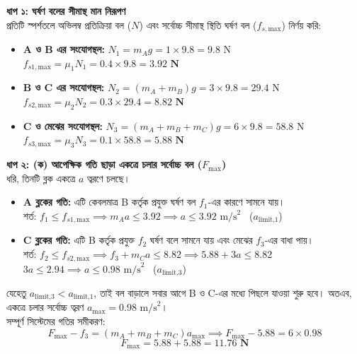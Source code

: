\documentclass[12pt, a4paper]{article}
\begin{document}
\begin{tcolorbox}[solutionbox={সমাধান (Solution) }]
\noindent
\textbf{ধাপ ১: ঘর্ষণ বলের সীমাস্থ মান নিরূপণ} \\
প্রতিটি স্পর্শতলে অভিলম্ব প্রতিক্রিয়া বল ($N$) এবং সর্বোচ্চ সীমাস্থ স্থিতি ঘর্ষণ বল ($f_{s,\text{max}}$) নির্ণয় করি:
\begin{itemize}[leftmargin=*, parsep=0.5ex]
    \item \textbf{A ও B এর সংযোগস্থল:} $N_1 = m_A g = 1 \times 9.8 = 9.8\text{ N}$ \\
    $f_{s1,\text{max}} = \mu_1 N_1 = 0.4 \times 9.8 = \mathbf{3.92\text{ N}}$
    \item \textbf{B ও C এর সংযোগস্থল:} $N_2 = (m_A + m_B)g = 3 \times 9.8 = 29.4\text{ N}$ \\
    $f_{s2,\text{max}} = \mu_2 N_2 = 0.3 \times 29.4 = \mathbf{8.82\text{ N}}$
    \item \textbf{C ও মেঝের সংযোগস্থল:} $N_3 = (m_A + m_B + m_C)g = 6 \times 9.8 = 58.8\text{ N}$ \\
    $f_{s3,\text{max}} = \mu_3 N_3 = 0.1 \times 58.8 = \mathbf{5.88\text{ N}}$
\end{itemize}

\vspace{0.5em}
\noindent
\textbf{ধাপ ২: (ক) আপেক্ষিক গতি ছাড়া একত্রে চলার সর্বোচ্চ বল ($F_{\text{max}}$)} \\
ধরি, তিনটি ব্লক একত্রে $a$ ত্বরণে চলছে। 
\begin{itemize}[leftmargin=*, parsep=0.5ex]
    \item \textbf{A ব্লকের গতি:} এটি কেবলমাত্র B কর্তৃক প্রযুক্ত ঘর্ষণ বল $f_1$-এর কারণে সামনে যায়। \\
    শর্ত: $f_1 \le f_{s1,\text{max}} \implies m_A a \le 3.92 \implies a \le 3.92\text{ m/s}^2$ \ ($a_{\text{limit,1}}$)
    \item \textbf{C ব্লকের গতি:} এটি B কর্তৃক প্রযুক্ত $f_2$ ঘর্ষণ বলে সামনে যায় এবং মেঝের $f_3$-এর বাধা পায়। \\
    শর্ত: $f_2 \le f_{s2,\text{max}} \implies f_3 + m_C a \le 8.82 \implies 5.88 + 3a \le 8.82$ \\
    $3a \le 2.94 \implies a \le 0.98\text{ m/s}^2$ \ ($a_{\text{limit,3}}$)
\end{itemize}
যেহেতু $a_{\text{limit,3}} < a_{\text{limit,1}}$, তাই বল বাড়ালে সবার আগে B ও C-এর মধ্যে পিছলে যাওয়া শুরু হবে। অতএব, একত্রে চলার সর্বোচ্চ ত্বরণ $a_{\text{max}} = 0.98\text{ m/s}^2$। \\
সম্পূর্ণ সিস্টেমের গতির সমীকরণ:
\[ F_{\text{max}} - f_3 = (m_A + m_B + m_C)a_{\text{max}} \implies F_{\text{max}} - 5.88 = 6 \times 0.98 \]
\[ F_{\text{max}} = 5.88 + 5.88 = \mathbf{11.76\text{ N}} \]


\end{tcolorbox}
\end{document}
